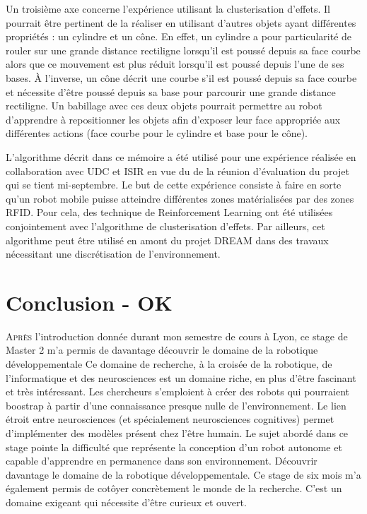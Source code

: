 \documentclass[draft]{llncs}
\begin{document}
Un troisième axe concerne l'expérience utilisant la clusterisation d'effets.
Il pourrait être pertinent de la réaliser en utilisant d'autres objets ayant différentes propriétés : un cylindre et un cône.
En effet, un cylindre a pour particularité de rouler sur une grande distance rectiligne lorsqu'il est poussé depuis sa face courbe alors que ce mouvement est plus réduit lorsqu'il est poussé depuis l'une de ses bases.
À l'inverse, un cône décrit une courbe s'il est poussé depuis sa face courbe et nécessite d'être poussé depuis sa base pour parcourir une grande distance rectiligne. 
Un babillage avec ces deux objets pourrait permettre au robot d'apprendre à repositionner les objets afin d'exposer leur face appropriée aux différentes actions (face courbe pour le cylindre et base pour le cône).

L'algorithme décrit dans ce mémoire a été utilisé pour une expérience réalisée en collaboration avec UDC et ISIR en vue du de la réunion d'évaluation du projet qui se tient mi-septembre. 
Le but de cette expérience consiste à faire en sorte qu'un robot mobile puisse atteindre différentes zones matérialisées par des zones RFID.
Pour cela, des technique de Reinforcement Learning ont été utilisées conjointement avec l'algorithme de clusterisation d'effets.
Par ailleurs, cet algorithme peut être utilisé en amont du projet DREAM dans des travaux nécessitant une discrétisation de l'environnement.





\section{Conclusion - OK}



\lettrine{A}{près} l'introduction donnée durant mon semestre de cours à Lyon, ce stage de Master 2 m'a permis de davantage découvrir le domaine de la robotique développementale 
Ce domaine de recherche, à la croisée de la robotique, de l'informatique et des neurosciences est un domaine riche, en plus d'être fascinant et très intéressant.
Les chercheurs s'emploient à créer des robots qui pourraient boostrap à partir d'une connaissance presque nulle de l'environnement.
Le lien étroit entre neurosciences (et spécialement neurosciences cognitives) permet d'implémenter des modèles présent chez l'être humain.
Le sujet abordé dans ce stage pointe la difficulté que représente la conception d'un robot autonome et capable d'apprendre en permanence dans son environnement.
Découvrir davantage le domaine de la robotique développementale.
Ce stage de six mois m'a également permis de cotôyer concrètement le monde de la recherche.
C'est un domaine exigeant qui nécessite d'être curieux et ouvert.
\end{document}
